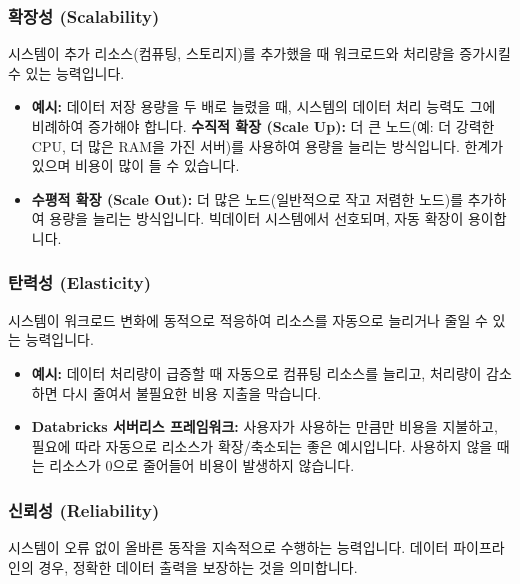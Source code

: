 \documentclass[11pt,a4paper]{article}
\theoremstyle{definition}
\begin{document}
\begin{enumerate}
\subsubsection{확장성 (Scalability)}
\begin{conceptbox}
시스템이 추가 리소스(컴퓨팅, 스토리지)를 추가했을 때 워크로드와 처리량을 증가시킬 수 있는 능력입니다.
\end{conceptbox}
\begin{itemize}
    \item \textbf{예시:} 데이터 저장 용량을 두 배로 늘렸을 때, 시스템의 데이터 처리 능력도 그에 비례하여 증가해야 합니다.
    \textbf{수직적 확장 (Scale Up):} 더 큰 노드(예: 더 강력한 CPU, 더 많은 RAM을 가진 서버)를 사용하여 용량을 늘리는 방식입니다. 한계가 있으며 비용이 많이 들 수 있습니다.
    \item \textbf{수평적 확장 (Scale Out):} 더 많은 노드(일반적으로 작고 저렴한 노드)를 추가하여 용량을 늘리는 방식입니다. 빅데이터 시스템에서 선호되며, 자동 확장이 용이합니다.
\end{itemize}

\subsubsection{탄력성 (Elasticity)}
\begin{conceptbox}
시스템이 워크로드 변화에 동적으로 적응하여 리소스를 자동으로 늘리거나 줄일 수 있는 능력입니다.
\end{conceptbox}
\begin{itemize}
    \item \textbf{예시:} 데이터 처리량이 급증할 때 자동으로 컴퓨팅 리소스를 늘리고, 처리량이 감소하면 다시 줄여서 불필요한 비용 지출을 막습니다.
    \item \textbf{Databricks 서버리스 프레임워크:} 사용자가 사용하는 만큼만 비용을 지불하고, 필요에 따라 자동으로 리소스가 확장/축소되는 좋은 예시입니다. 사용하지 않을 때는 리소스가 0으로 줄어들어 비용이 발생하지 않습니다.
\end{itemize}

\subsubsection{신뢰성 (Reliability)}
\begin{conceptbox}
시스템이 오류 없이 올바른 동작을 지속적으로 수행하는 능력입니다. 데이터 파이프라인의 경우, 정확한 데이터 출력을 보장하는 것을 의미합니다.
\end{conceptbox}


\end{enumerate}
\end{document}

